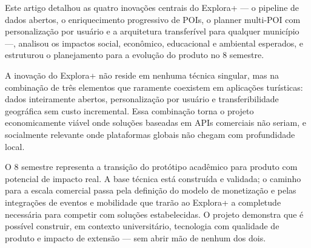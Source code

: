 \documentclass[12pt, a4paper]{article}
\begin{document}
Este artigo detalhou as quatro inova\c{c}\~oes centrais do Explora+ --- o pipeline de dados abertos, o enriquecimento progressivo de POIs, o planner multi-POI com personaliza\c{c}\~ao por usu\'ario e a arquitetura transfer\'ivel para qualquer munic\'ipio ---, analisou os impactos social, econ\^omico, educacional e ambiental esperados, e estruturou o planejamento para a evolu\c{c}\~ao do produto no 8\textordmasculine{} semestre.

A inova\c{c}\~ao do Explora+ n\~ao reside em nenhuma t\'ecnica singular, mas na combina\c{c}\~ao de tr\^es elementos que raramente coexistem em aplica\c{c}\~oes tur\'isticas: dados inteiramente abertos, personaliza\c{c}\~ao por usu\'ario e transferibilidade geogr\'afica sem custo incremental. Essa combina\c{c}\~ao torna o projeto economicamente vi\'avel onde solu\c{c}\~oes baseadas em APIs comerciais n\~ao seriam, e socialmente relevante onde plataformas globais n\~ao chegam com profundidade local.

O 8\textordmasculine{} semestre representa a transi\c{c}\~ao do prot\'otipo acad\^emico para produto com potencial de impacto real. A base t\'ecnica est\'a constru\'ida e validada; o caminho para a escala comercial passa pela defini\c{c}\~ao do modelo de monetiza\c{c}\~ao e pelas integra\c{c}\~oes de eventos e mobilidade que trar\~ao ao Explora+ a completude necess\'aria para competir com solu\c{c}\~oes estabelecidas. O projeto demonstra que \'e poss\'ivel construir, em contexto universit\'ario, tecnologia com qualidade de produto e impacto de extens\~ao --- sem abrir m\~ao de nenhum dos dois.

\printbibliography[title={Refer\^encias}]
\end{document}

